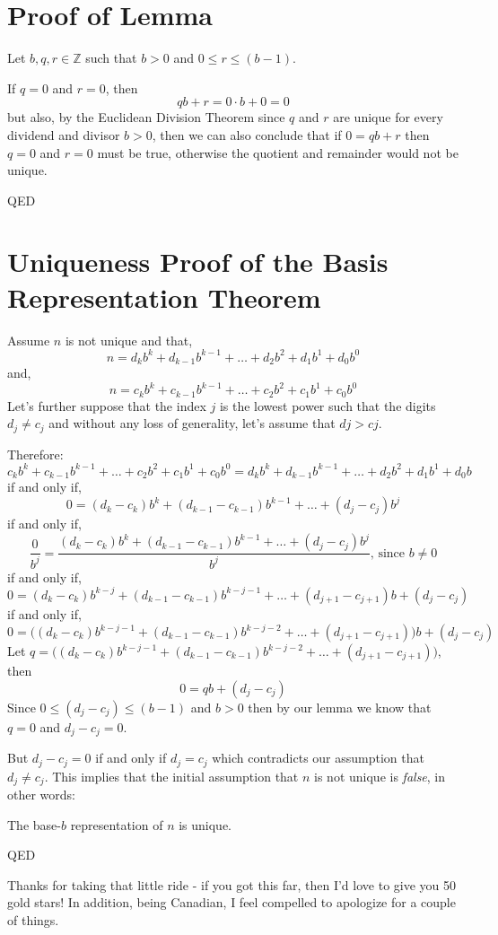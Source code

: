 \documentclass{article}
\newenvironment{jprIn}{\begin{adjustwidth}{2em}{}}{\end{adjustwidth}}
\begin{document}
\section*{Proof of Lemma}
\begin{jprIn}
Let $b, q, r \in{} \mathbb{Z}$ such that $b>0$ and $0\le{}r\le{}(b-1)$.

If $q=0$ and $r=0$, then
\[qb+r=0\cdot{}b+0=0\]
but also, by the Euclidean Division Theorem since $q$ and $r$ are unique for every dividend and divisor $b>0$,
then we can also conclude that if $0=qb+r$ then $q=0$ and $r=0$ must be true, otherwise the quotient and remainder
would not be unique.

QED
\end{jprIn}

\section*{Uniqueness Proof of the Basis Representation Theorem}

Assume $n$ is not unique and that,
\[n=d_kb^k+d_{k-1}b^{k-1}+\dots+d_2b^2+d_1b^1+d_0b^0\]
and,
\[n=c_kb^k+c_{k-1}b^{k-1}+\dots+c_2b^2+c_1b^1+c_0b^0\]
Let's further suppose that the index $j$ is the lowest power such that the digits $d_j\ne{}c_j$ and without any loss of generality,
let's assume that $dj>cj$.

Therefore:
\[c_kb^k+c_{k-1}b^{k-1}+\dots+c_2b^2+c_1b^1+c_0b^0=d_kb^k+d_{k-1}b^{k-1}+\dots+d_2b^2+d_1b^1+d_0b\]
if and only if,
\[0=(d_k-c_k)b^k+(d_{k-1}-c_{k-1})b^{k-1}+\dots+(d_j-c_j)b^j\]
if and only if,
\[\frac{0}{b^j}=\frac{(d_k-c_k)b^k+(d_{k-1}-c_{k-1})b^{k-1}+\dots+(d_j-c_j)b^j}{b^j}\text{, since }b\ne0\]
if and only if,
\[0=(d_k-c_k)b^{k-j}+(d_{k-1}-c_{k-1})b^{k-j-1}+\dots+(d_{j+1}-c_{j+1})b+(d_j-c_j)\]
if and only if,
\[0=\big((d_k-c_k)b^{k-j-1}+(d_{k-1}-c_{k-1})b^{k-j-2}+\dots+(d_{j+1}-c_{j+1})\big)b+(d_j-c_j)\]
Let $q=\big((d_k-c_k)b^{k-j-1}+(d_{k-1}-c_{k-1})b^{k-j-2}+\dots+(d_{j+1}-c_{j+1})\big)$, then
\[0=qb+(d_j-c_j)\]
Since $0\le(d_j-c_j)\le(b-1)$ and $b>0$ then by our lemma we know that\\
$q=0$ and $d_j-c_j = 0$.

But $d_j-c_j = 0$ if and only if $d_j = c_j$
which contradicts our assumption that $d_j\ne{}c_j$. This implies that the initial assumption that $n$
is not unique is \emph{false}, in other words:

The base-$b$ representation of $n$ is unique.

QED

\break
Thanks for taking that little ride - if you got this far,
then I'd love to give you 50 gold stars!
In addition, being Canadian, I feel compelled to apologize for a couple of things.
\end{document}

